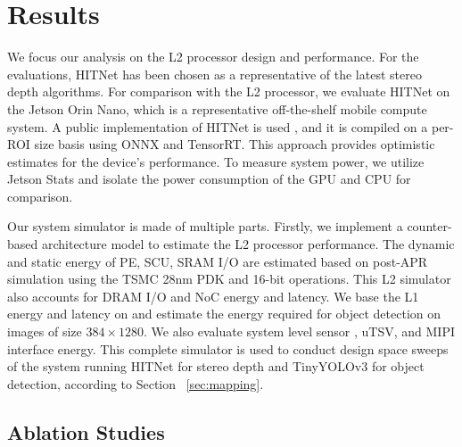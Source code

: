 \section{Results}\label{sec:results}

We focus our analysis on the L2 processor design and performance.
For the evaluations, HITNet \cite{hitnet} has been chosen as a representative of the latest stereo depth algorithms.
For comparison with the L2 processor, we evaluate HITNet on the Jetson Orin Nano, which is a representative off-the-shelf mobile compute system.
A public implementation of HITNet is used \cite{tinyhitnet}, and it is compiled on a per-ROI size basis using ONNX and TensorRT. This approach provides optimistic estimates for the device's performance.
To measure system power, we utilize Jetson Stats and isolate the power consumption of the GPU and CPU for comparison.

Our system simulator is made of multiple parts. 
Firstly, we implement a counter-based architecture model to estimate the L2 processor performance.
The dynamic and static energy of PE, SCU,  SRAM I/O are estimated based on post-APR simulation using the TSMC 28nm PDK and 16-bit operations.
This L2 simulator also accounts for DRAM I/O \cite{lpddr4x, lpddr5_est} and NoC \cite{ansa} energy and latency.
We base the L1 energy and latency on \cite{marsellus} and estimate the energy required for object detection on images of size $384\times1280$.
We also evaluate system level sensor \cite{gs_cis1}, uTSV, and MIPI interface \cite{gomez_distributed_2022} energy.
This complete simulator is used to conduct design space sweeps of the \projname{} system running HITNet for stereo depth and TinyYOLOv3 for object detection, according to Section ~\ref{sec:mapping}.

\subsection{Ablation Studies}


